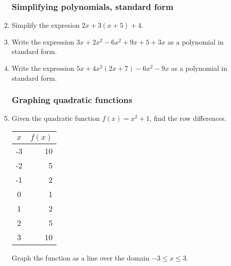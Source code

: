 \documentclass[12pt, oneside]{article}
\begin{document}
\begin{enumerate}
\subsubsection*{Simplifying polynomials, standard form}

\item Simplify the expresion $2x + 3(x+5)+4$.\vspace{4cm}
\item Write the expression $3x+2x^2-6x^2+9x+5+3x$ as a polynomial in standard form. \vspace{7cm}

  \item Write the expression $5x+4x^2(2x+7)-6x^2-9x$ as a polynomial in standard form.

\newpage


\subsubsection*{Graphing quadratic functions}

\item Given the quadratic function $f(x)=x^2+1$, find the row differences.
  \renewcommand{\arraystretch}{1.6}
    \begin{center}
      \begin{tabular}{|c|r|}
      \hline
      $x$ & $f(x)$\\
      \hline
      -3 & 10 \\
      \hline
      -2 & 5 \\
      \hline
      -1 & 2 \\
      \hline
      0 & 1 \\
      \hline
      1 & 2 \\
      \hline
      2 & 5 \\
      \hline
      3 & 10 \\
      \hline
      \end{tabular}
    \end{center}
Graph the function as a line over the domain $-3 \leq x \leq 3$.

\begin{center} %
\end{center}


\end{enumerate}
\end{document}
